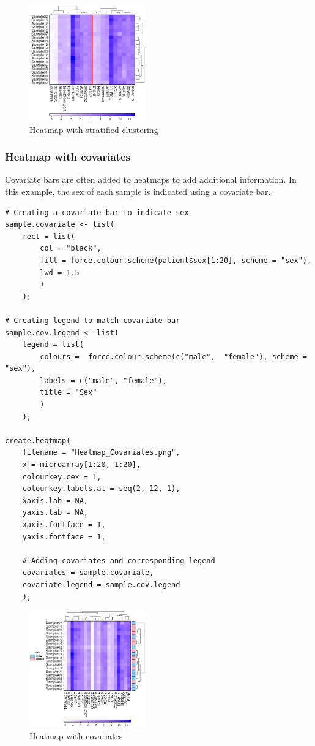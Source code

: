 \documentclass[letterpaper]{article}
\begin{document}
\begin{figure}[!ht]
  \begin{center}
     \includegraphics[width=50mm]{Figures/Heatmap_Stratified_Clustering.png}
     \caption{Heatmap with stratified clustering}
  \end{center}
\end{figure}

\subsubsection{Heatmap with covariates}
Covariate bars are often added to heatmaps to add additional information. In this example, the sex of each sample is indicated using a covariate bar.

\begin{verbatim}
# Creating a covariate bar to indicate sex
sample.covariate <- list(
    rect = list(
        col = "black",
        fill = force.colour.scheme(patient$sex[1:20], scheme = "sex"),
        lwd = 1.5
        )
    );

# Creating legend to match covariate bar
sample.cov.legend <- list(
    legend = list(
        colours =  force.colour.scheme(c("male",  "female"), scheme = "sex"),
        labels = c("male", "female"),
        title = "Sex"
        )
    );
    
create.heatmap(
    filename = "Heatmap_Covariates.png",
    x = microarray[1:20, 1:20],
    colourkey.cex = 1,
    colourkey.labels.at = seq(2, 12, 1),    
    xaxis.lab = NA,
    yaxis.lab = NA,
    xaxis.fontface = 1,
    yaxis.fontface = 1,

    # Adding covariates and corresponding legend
    covariates = sample.covariate,
    covariate.legend = sample.cov.legend
    );
\end{verbatim}

\begin{figure}[!ht]
  \begin{center}
     \includegraphics[width=50mm]{Figures/Heatmap_Covariates.png}
     \caption{Heatmap with covariates}
  \end{center}
\end{figure}
\end{document}
